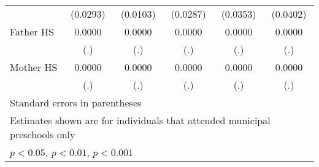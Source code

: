 \begin{table}[htbp]
\begin{tabular}{l*{5}{c}}
            &    (0.0293)         &    (0.0103)         &    (0.0287)         &    (0.0353)         &    (0.0402)         \\
\addlinespace
Father HS   &      0.0000         &      0.0000         &      0.0000         &      0.0000         &      0.0000         \\
            &         (.)         &         (.)         &         (.)         &         (.)         &         (.)         \\
\addlinespace
Mother HS   &      0.0000         &      0.0000         &      0.0000         &      0.0000         &      0.0000         \\
            &         (.)         &         (.)         &         (.)         &         (.)         &         (.)         \\
\bottomrule
\multicolumn{6}{l}{\footnotesize Standard errors in parentheses}\\
\multicolumn{6}{l}{\footnotesize Estimates shown are for individuals that attended municipal preschools only}\\
\multicolumn{6}{l}{\footnotesize \sym{*} \(p<0.05\), \sym{**} \(p<0.01\), \sym{***} \(p<0.001\)}\\
\end{tabular}
\end{table}
